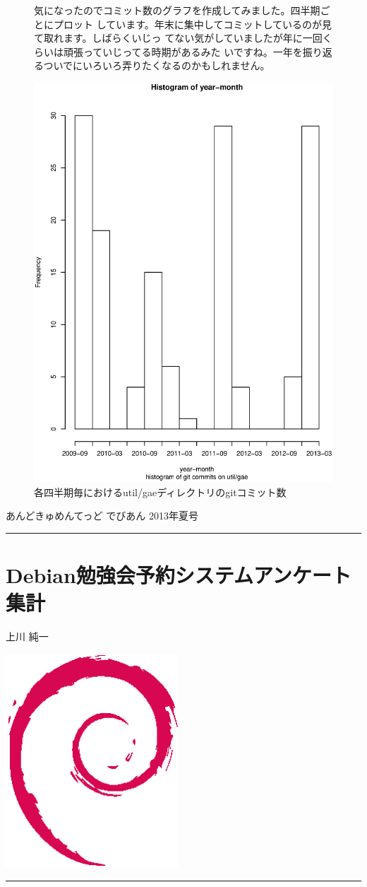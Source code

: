 \documentclass[mingoth,a4paper]{jsarticle}
\renewcommand{\dancersection}[2]{%
\newpage
あんどきゅめんてっど でびあん 2013年夏号
%
\vspace{0.1mm}\\
{\color{dancerdarkblue}\rule{\hsize}{2mm}}

%
%
\begin{minipage}[t]{0.6\hsize}
\color{dancerdarkblue}
\vspace{1cm}
\section{#1}
\hfill{}#2\\
\end{minipage}
\begin{minipage}[t]{0.4\hsize}
\vspace{-2cm}
\hfill{}\includegraphics[height=8cm]{image200502/openlogo-nd.eps}\\
\vspace{-5cm}
\end{minipage}
%
{\color{dancerlightblue}\rule{0.66\hsize}{2mm}}
%
\vspace{2cm}
}
\begin{document}
\begin{figure}[ht]
\begin{minipage}{0.5\hsize}
気になったのでコミット数のグラフを作成してみました。四半期ごとにプロット
しています。年末に集中してコミットしているのが見て取れます。しばらくいじっ
てない気がしていましたが年に一回くらいは頑張っていじってる時期があるみた
いですね。一年を振り返るついでにいろいろ弄りたくなるのかもしれません。
\end{minipage}
\begin{minipage}{0.5\hsize}
\begin{center}
\includegraphics[width=1\hsize]{image201304/util-gae-commits.eps}
\end{center} 
\caption{各四半期毎におけるutil/gaeディレクトリのgitコミット数}
\end{minipage}
\end{figure}

\dancersection{Debian勉強会予約システムアンケート集計}{上川 純一}
\end{document}
